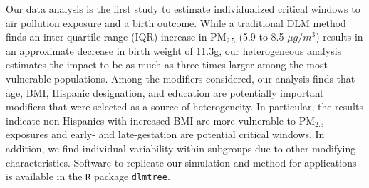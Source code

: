 \documentclass[12pt]{article}
\begin{document}
Our data analysis is the first study to estimate individualized critical windows to air pollution exposure and a birth outcome. While a traditional DLM method finds an inter-quartile range (IQR) increase in PM$_{2.5}$ (5.9 to 8.5 $\mu g/m^3$) results in an approximate decrease in birth weight of 11.3g, our heterogeneous analysis estimates the impact to be as much as three times larger among the most vulnerable populations. Among the modifiers considered, our analysis finds that age, BMI, Hispanic designation, and education are potentially important modifiers that were selected as a source of heterogeneity. In particular, the results indicate non-Hispanics with increased BMI are more vulnerable to PM$_{2.5}$ exposures and early- and late-gestation are potential critical windows. In addition, we find individual variability within subgroups due to other modifying characteristics. Software to replicate our simulation and method for applications is available in the \texttt{R} package \texttt{dlmtree}.



\end{document}
